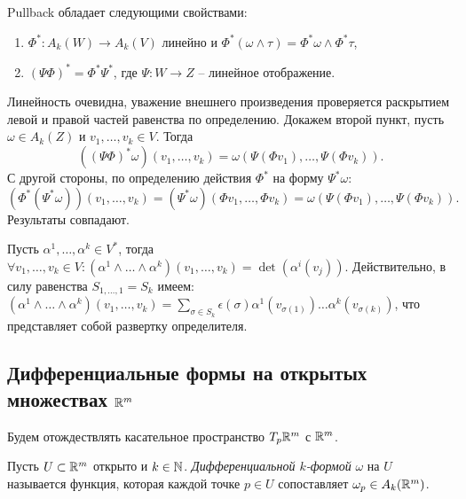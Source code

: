 \begin{lemma}
	Pullback обладает следующими свойствами:
	\begin{enumerate}[itemsep = 0pt, topsep = 5pt]
		\item $\Phi^* : A_k(W) \to A_k(V)$ линейно и $\Phi^*(\omega \wedge \tau) = \Phi^* \omega \wedge \Phi^* \tau$, 
		\item $(\Psi \Phi)^* = \Phi^* \Psi^*$, где $\Psi : W \to Z$ -- линейное отображение.
	\end{enumerate}
\end{lemma}

\begin{myproof}
	Линейность очевидна, уважение внешнего произведения проверяется раскрытием левой и правой частей равенства по определению. 
	Докажем второй пункт, пусть $\omega \in A_k(Z)$ и $v_1, \dots, v_k \in V$. Тогда
	\[ ((\Psi \Phi)^* \omega)(v_1, \dotsc, v_k) = \omega(\Psi(\Phi v_1), \dotsc, \Psi(\Phi v_k)). \]
	С другой стороны, по определению действия $\Phi^*$ на форму $\Psi^* \omega$:
	\[ (\Phi^* (\Psi^* \omega))(v_1, \dotsc, v_k) = (\Psi^* \omega)(\Phi v_1, \dotsc, \Phi v_k) = \omega(\Psi(\Phi v_1), \dotsc, \Psi(\Phi v_k)). \]
	Результаты совпадают.
\end{myproof}

\begin{example}
	Пусть $\alpha^1, \dotsc, \alpha^k \in V^*$, тогда $\forall v_1, \dotsc, v_k \in V : (\alpha^1 \wedge \dotsc \wedge \alpha^k) (v_1, \dotsc, v_k) = \det (\alpha^i(v_j))$.
	Действительно, в силу равенства $S_{1, \dotsc, 1} = S_k$ имеем: 
	$(\alpha^1 \wedge \dotsc \wedge \alpha^k) (v_1, \dotsc, v_k) = \sum_{\sigma \in S_k} \epsilon(\sigma) \alpha^1(v_{\sigma(1)}) \dotsc \alpha^k(v_{\sigma(k)})$, что представляет собой развертку определителя.
\end{example}

\subsection{Дифференциальные формы на открытых множествах $\mathbb{R}^m$}
	
Будем отождествлять касательное пространство $T_p \mathbb{R}^m$ с $\mathbb{R}^m$.

\begin{definition}
	Пусть $U \subset \mathbb{R}^m$ открыто и $k \in \mathbb{N}$. \textit{Дифференциальной $k$-формой} $\omega$ на $U$ называется функция, которая каждой точке $p \in U$ сопоставляет $\omega_p \in A_k(\mathbb{R}^m)$.
\end{definition}

